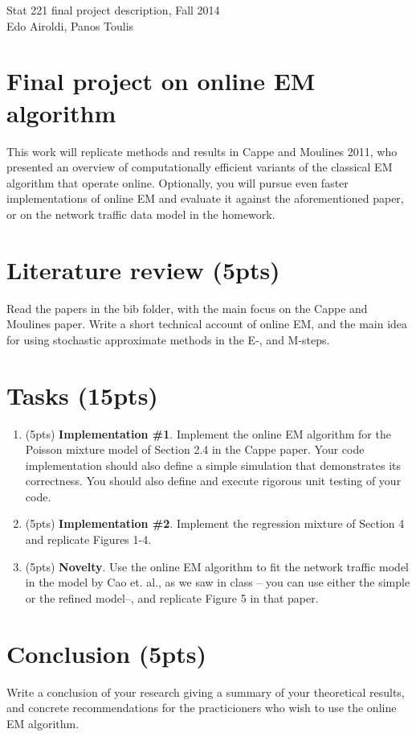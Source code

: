 \documentclass[12pt]{article}
\begin{document}
Stat 221 final project description, Fall 2014 \\
Edo Airoldi, Panos Toulis
\section*{Final project on online EM algorithm}
This work will replicate methods and results in Cappe and Moulines 2011, who presented an overview of computationally efficient variants of the classical EM algorithm that operate online. Optionally, you will pursue even faster implementations of online EM and evaluate it against the aforementioned paper, or on the network traffic data model in the homework.

\section{Literature review (5pts)}
Read the papers in the bib folder, with the main focus on the Cappe and Moulines paper.
Write a short technical account of online EM, and the main idea for using 
stochastic approximate methods in the E-, and M-steps.

\section{Tasks (15pts)}
\begin{enumerate}
\item (5pts) \textbf{Implementation \#1}. Implement the online EM algorithm 
	for the Poisson mixture model of Section 2.4 in the Cappe paper. 
	Your code implementation should also define a simple simulation 
	that demonstrates its correctness.
	You should also define and execute rigorous unit testing of your code.
\item (5pts)  \textbf{Implementation \#2}. 
	Implement the regression mixture of Section 4 and replicate Figures 1-4.
\item (5pts) \textbf{Novelty}. Use the online EM algorithm to fit the network traffic model in the model
by Cao et. al., as we saw in class -- you can use either the simple or the refined model--,
	and replicate Figure 5 in that paper.
\end{enumerate}

\section{Conclusion (5pts)}
Write a conclusion of your research giving a summary of your theoretical results, 
and concrete recommendations for the practicioners who wish to use the online EM algorithm.
\end{document}
